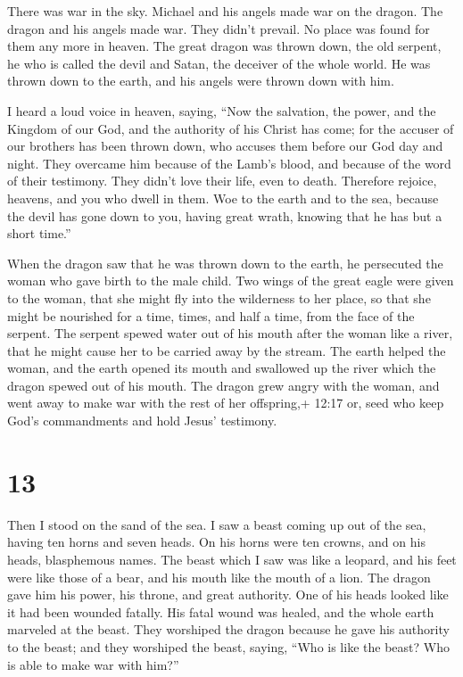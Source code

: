  There was war in the sky. Michael and his angels made war
on the dragon. The dragon and his angels made war.  They
didn't prevail. No place was found for them any more in heaven.
 The great dragon was thrown down, the old serpent, he who
is called the devil and Satan, the deceiver of the whole world. He was
thrown down to the earth, and his angels were thrown down with him.

 I heard a loud voice in heaven, saying, ``Now the
salvation, the power, and the Kingdom of our God, and the authority of
his Christ has come; for the accuser of our brothers has been thrown
down, who accuses them before our God day and night.  They
overcame him because of the Lamb's blood, and because of the word of
their testimony. They didn't love their life, even to death.
 Therefore rejoice, heavens, and you who dwell in them. Woe
to the earth and to the sea, because the devil has gone down to you,
having great wrath, knowing that he has but a short time.''

 When the dragon saw that he was thrown down to the earth,
he persecuted the woman who gave birth to the male child. 
Two wings of the great eagle were given to the woman, that she might fly
into the wilderness to her place, so that she might be nourished for a
time, times, and half a time, from the face of the serpent.
 The serpent spewed water out of his mouth after the woman
like a river, that he might cause her to be carried away by the stream.
 The earth helped the woman, and the earth opened its mouth
and swallowed up the river which the dragon spewed out of his mouth.
 The dragon grew angry with the woman, and went away to
make war with the rest of her offspring,+ 12:17 or, seed who keep God's
commandments and hold Jesus' testimony.

\hypertarget{section-12}{%
\section{13}\label{section-12}}

 Then I stood on the sand of the sea. I saw a beast coming
up out of the sea, having ten horns and seven heads. On his horns were
ten crowns, and on his heads, blasphemous names.  The beast
which I saw was like a leopard, and his feet were like those of a bear,
and his mouth like the mouth of a lion. The dragon gave him his power,
his throne, and great authority.  One of his heads looked
like it had been wounded fatally. His fatal wound was healed, and the
whole earth marveled at the beast.  They worshiped the
dragon because he gave his authority to the beast; and they worshiped
the beast, saying, ``Who is like the beast? Who is able to make war with
him?''

